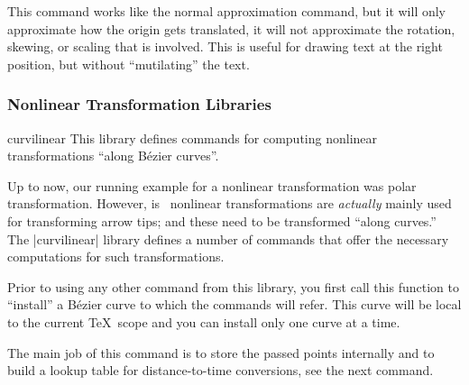 \begin{command}{\pgfapproximatenonlineartranslation}
  This command works like the normal approximation command, but it
  will only approximate how the origin gets translated, it will not
  approximate the rotation, skewing, or scaling that is involved. This
  is useful for drawing text at the right position, but without
  ``mutilating'' the text.
\begin{codeexample}[]
\end{codeexample}
\end{command}


\subsubsection{Nonlinear Transformation Libraries}
\label{section-library-curvilinear}

\begin{pgflibrary}{curvilinear}
  This library defines commands for computing nonlinear
  transformations ``along Bézier curves''.
\end{pgflibrary}

Up to now, our running example for a nonlinear transformation was
polar transformation. However, is \pgfname\ nonlinear transformations
are \emph{actually} mainly used for transforming arrow tips; and these
need to be transformed ``along curves.'' The |curvilinear| library
defines a number of commands that offer the necessary computations for
such transformations.

\begin{command}{\pgfsetcurvilinearbeziercurve{}}
  Prior to using any other command from this library, you first call
  this function to ``install'' a Bézier curve to which the commands
  will refer. This curve will be local to the current \TeX\ scope and
  you can install only one curve at a time.

  The main job of this command is to store the passed points
  internally and to build a lookup table for distance-to-time
  conversions, see the next command.
\begin{codeexample}
\pgfsetcurvilinearbeziercurve
  {\pgfpointorigin}
  {\pgfpoint{1cm}{1cm}}
  {\pgfpoint{2cm}{1cm}}
  {\pgfpoint{3cm}{0cm}}
\end{codeexample}
\end{command}

